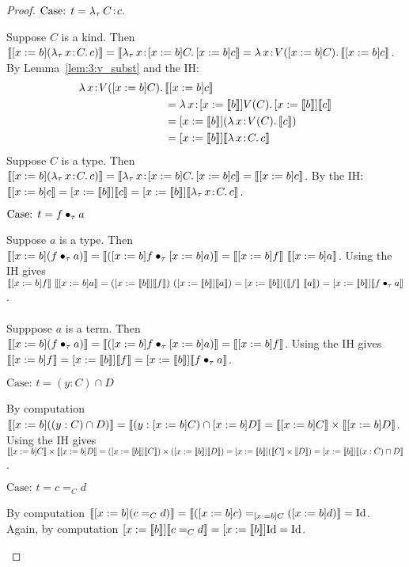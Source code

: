 \begin{proof}
    $\text{Case: } t = \abs{\lambda_\tau}{C}{c}$
    \begin{proofcase}
        Suppose $C$ is a kind.
        Then $\llbracket [x := b]({\lambda_\tau}\, x\! : \! C.\, c) \rrbracket = \llbracket {\lambda_\tau}\, x\! : \! [x := b]C.\, [x := b]c \rrbracket = {\lambda}\, x\! : \! V([x := b]C).\, \llbracket [x := b]c \rrbracket$.
        By Lemma~\ref{lem:3:v_subst} and the IH:
        \begin{align*}
            \abs{\lambda}{x}{V([x := b]C)}&{\sema{[x := b]c}} \\
            &= \abs{\lambda}{x}{[x := \sema{b}]V(C)}{[x := \sema{b}]\sema{c}} \\
            &= [x := \sema{b}](\abs{\lambda}{x}{V(C)}{\sema{c}}) \\
            &= [x := \sema{b}]\sema{\abs{\lambda}{x}{C}{c}} \\
        \end{align*}
        Suppose $C$ is a type.
        Then $\llbracket [x := b]({\lambda_\tau}\, x\! : \! C.\, c) \rrbracket = \llbracket {\lambda_\tau}\, x\! : \! [x := b]C.\, [x := b]c \rrbracket = \llbracket [x := b]c \rrbracket$.
        By the IH: $\llbracket [x := b]c \rrbracket = [x := \llbracket b \rrbracket]\llbracket c \rrbracket = [x := \llbracket b \rrbracket]\llbracket {\lambda_\tau}\, x\! : \! C.\, c \rrbracket$.
    \end{proofcase}

    $\text{Case: } t = f \bullet_{\tau} a$
    \begin{proofcase}
        Suppose $a$ is a type.
        Then $\llbracket [x := b](f \bullet_{\tau} a) \rrbracket = \llbracket ([x := b]f \bullet_{\tau} [x := b]a) \rrbracket = \llbracket [x := b]f \rrbracket\ \llbracket [x := b]a \rrbracket$.
        Using the IH gives $\llbracket [x := b]f \rrbracket\ \llbracket [x := b]a \rrbracket = ([x := \llbracket b \rrbracket]\llbracket f \rrbracket)\ ([x := \llbracket b \rrbracket]\llbracket a \rrbracket) = [x := \llbracket b \rrbracket](\llbracket f \rrbracket\ \llbracket a \rrbracket) = [x := \llbracket b \rrbracket]\llbracket f \bullet_{\tau} a \rrbracket$.
        \\ \\
        Supppose $a$ is a term.
        Then $\llbracket [x := b](f \bullet_{\tau} a) \rrbracket = \llbracket ([x := b]f \bullet_{\tau} [x := b]a) \rrbracket = \llbracket [x := b]f \rrbracket$.
        Using the IH gives $\llbracket [x := b]f \rrbracket = [x := \llbracket b \rrbracket]\llbracket f \rrbracket = [x := \llbracket b \rrbracket]\llbracket f \bullet_{\tau} a \rrbracket$.
    \end{proofcase}

    $\text{Case: } t = (y : C) \cap D$
    \begin{proofcase}
        By computation $\llbracket [x := b]((y : C) \cap D) \rrbracket = \llbracket (y : [x := b]C) \cap [x := b]D \rrbracket = \llbracket [x := b]C \rrbracket \times \llbracket [x := b]D \rrbracket$.
        Using the IH gives $\llbracket [x := b]C \rrbracket \times \llbracket [x := b]D \rrbracket = ([x := \llbracket b \rrbracket]\llbracket C \rrbracket) \times ([x := \llbracket b \rrbracket]\llbracket D \rrbracket) = [x := \llbracket b \rrbracket](\llbracket C \rrbracket \times \llbracket D \rrbracket) = [x := \llbracket b \rrbracket]\llbracket (x : C) \cap D \rrbracket$.
    \end{proofcase}

    $\text{Case: } t = c =_C d$
    \begin{proofcase}
        By computation $\llbracket [x := b](c =_C d) \rrbracket = \llbracket ([x := b]c) =_{[x := b]C} ([x := b]d) \rrbracket = \text{Id}$.
        Again, by computation $[x := \llbracket b \rrbracket]\llbracket c =_C d \rrbracket = [x := \llbracket b \rrbracket]\text{Id} = \text{Id}$.
    \end{proofcase}
\end{proof}

